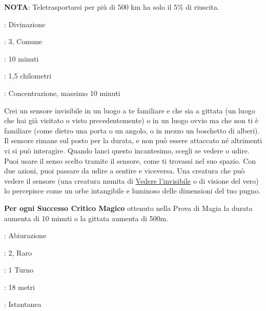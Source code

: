 \begin{multicols}{2}
\textbf{NOTA}: Teletrasportarsi per più di 500 km ha solo il 5\% di riuscita.

\noindent\colorbox{OBSSgold!10}{
\begin{minipage}{0.95\linewidth}
\begin{description}[noitemsep, topsep=0pt, parsep=0pt, partopsep=0pt, leftmargin=0cm, labelwidth=1.3cm]
	\item[\textbf{Lista}]: Divinazione
	\item[\textbf{Livello}]: 3, Comune
	\item[\textbf{Lancio}]: 10 minuti
	\item[\textbf{Gittata}]: 1,5 chilometri
	\item[\textbf{Durata}]: Concentrazione, massimo 10 minuti
\end{description}
\end{minipage}}\smallskip

Crei un sensore invisibile in un luogo a te familiare e che sia a gittata (un luogo che hai già visitato o visto precedentemente) o in un luogo ovvio ma che non ti è familiare (come dietro una porta o un angolo, o in mezzo un boschetto di alberi). Il sensore rimane sul posto per la durata, e non può essere attaccato né altrimenti vi si può interagire. Quando lanci questo incantesimo, scegli se vedere o udire. Puoi usare il senso scelto tramite il sensore, come ti trovassi nel suo spazio. Con due azioni, puoi passare da udire a sentire e viceversa. Una creatura che può vedere il sensore (una creatura munita di \hyperlink{Vedere l'invisibile}{Vedere l'invisibile} o di visione del vero) lo percepisce come un orbe intangibile e luminoso delle dimensioni del tuo pugno.

\textbf{Per ogni Successo Critico Magico} ottenuto nella Prova di Magia la durata aumenta di 10 minuti o la gittata aumenta di 500m.

\noindent\colorbox{OBSSgold!10}{
\begin{minipage}{0.95\linewidth}
\begin{description}[noitemsep, topsep=0pt, parsep=0pt, partopsep=0pt, leftmargin=0cm, labelwidth=1.3cm]
	\item[\textbf{Lista}]: Abiurazione
	\item[\textbf{Livello}]: 2, Raro
	\item[\textbf{Lancio}]:  1 Turno
	\item[\textbf{Gittata}]: 18 metri
	\item[\textbf{Durata}]: Istantanea
\end{description}
\end{minipage}}\smallskip


\end{multicols}
